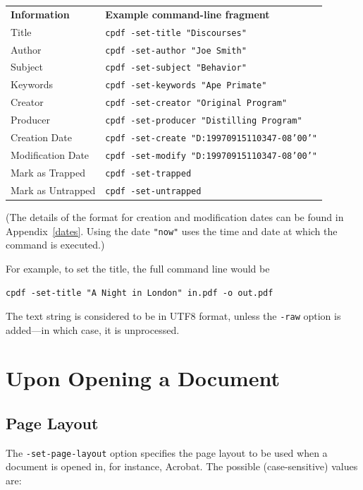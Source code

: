 \documentclass[a4paper,makeidx]{memoir}
\begin{document}
\begin{framed}
    \noindent\begin{tabular}{ll}
       \textbf{Information} & \textbf{Example command-line fragment} \\
       Title & \texttt{cpdf -set-title "Discourses"} \\
       Author & \texttt{cpdf -set-author "Joe Smith"} \\
       Subject & \texttt{cpdf -set-subject "Behavior"} \\
       Keywords & \texttt{cpdf -set-keywords "Ape Primate"} \\
       Creator & \texttt{cpdf -set-creator "Original Program"} \\
       Producer & \texttt{cpdf -set-producer "Distilling Program"} \\
       Creation Date & \texttt{cpdf -set-create "D:19970915110347-08'00'"} \\
       Modification Date & \texttt{cpdf -set-modify "D:19970915110347-08'00'"} \\
       Mark as Trapped & \texttt{cpdf -set-trapped} \\
       Mark as Untrapped & \texttt{cpdf -set-untrapped} \\
    \end{tabular}
\end{framed}

  \noindent (The details of the format for creation and modification dates can be found
in Appendix~\ref{dates}. Using the date \texttt{"now"} uses the time and date
at which the command is executed.)
  
  \vspace{2mm}
  For example, to set the title, the full command line would be
  \begin{framed}
    \small\verb!cpdf -set-title "A Night in London" in.pdf -o out.pdf!
  \end{framed}
\noindent The text string is considered to be in UTF8 format, unless the \texttt{-raw}
option is added---in which case, it is unprocessed.

\section{Upon Opening a Document}

  \subsection{Page Layout}
  The \texttt{-set-page-layout} option specifies the page layout to be used
when a document is opened in, for instance, Acrobat. The possible
(case-sensitive) values are:
\end{document}
